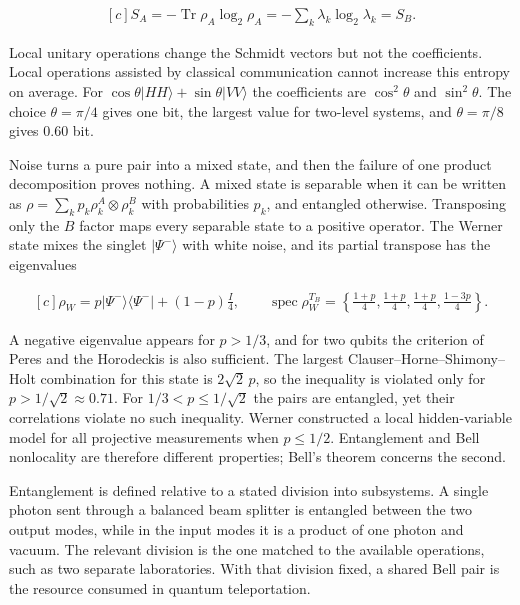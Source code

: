 \documentclass[11pt,oneside]{book}
\newenvironment{centeredalign}{\[\begin{gathered}[c]}{\end{gathered}\]}
\newcommand{\ket}[1]{\lvert #1\rangle}
\newcommand{\bra}[1]{\langle #1\rvert}
\begin{document}
\begin{centeredalign}
S_A=-\operatorname{Tr}\rho_A\log_2\rho_A=-\sum_k\lambda_k\log_2\lambda_k=S_B.
\end{centeredalign}

Local unitary operations change the Schmidt vectors but not the coefficients. Local operations assisted by classical communication cannot increase this entropy on average. For \(\cos\theta\ket{HH}+\sin\theta\ket{VV}\) the coefficients are \(\cos^2\theta\) and \(\sin^2\theta\). The choice \(\theta=\pi/4\) gives one bit, the largest value for two-level systems, and \(\theta=\pi/8\) gives 0.60 bit.

Noise turns a pure pair into a mixed state, and then the failure of one product decomposition proves nothing. A mixed state is separable when it can be written as \(\rho=\sum_kp_k\rho_k^A\otimes\rho_k^B\) with probabilities \(p_k\), and entangled otherwise. Transposing only the \(B\) factor maps every separable state to a positive operator. The Werner state mixes the singlet \(\ket{\Psi^-}\) with white noise, and its partial transpose has the eigenvalues

\begin{centeredalign}
\rho_W=p\ket{\Psi^-}\bra{\Psi^-}+(1-p)\frac{I}{4},\qquad
\operatorname{spec}\rho_W^{T_B}=\left\{\tfrac{1+p}{4},\tfrac{1+p}{4},\tfrac{1+p}{4},\tfrac{1-3p}{4}\right\}.
\end{centeredalign}

A negative eigenvalue appears for \(p>1/3\), and for two qubits the criterion of Peres and the Horodeckis is also sufficient. The largest Clauser--Horne--Shimony--Holt combination for this state is \(2\sqrt2\,p\), so the inequality is violated only for \(p>1/\sqrt2\approx0.71\). For \(1/3<p\leq1/\sqrt2\) the pairs are entangled, yet their correlations violate no such inequality. Werner constructed a local hidden-variable model for all projective measurements when \(p\leq1/2\). Entanglement and Bell nonlocality are therefore different properties; Bell's theorem concerns the second.

Entanglement is defined relative to a stated division into subsystems. A single photon sent through a balanced beam splitter is entangled between the two output modes, while in the input modes it is a product of one photon and vacuum. The relevant division is the one matched to the available operations, such as two separate laboratories. With that division fixed, a shared Bell pair is the resource consumed in quantum teleportation.
\end{document}
